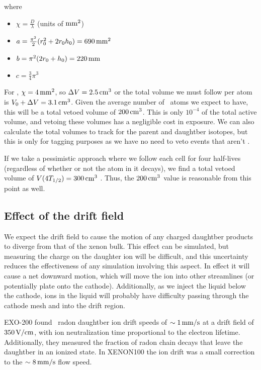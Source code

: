 where
\begin{itemize}
    \item $\chi = \frac{D}{\lambda}$ (units of $\mathrm{mm^2}$)
    \item $a = \frac{\pi^{2}}{2} (r_0^2+2 r_0 h_0) = 690\,\mathrm{mm^2}$
    \item $b = \pi^2 (2r_0 + h_0) = 220\,\mathrm{mm}$
    \item $c = \frac{3}{4} \pi^{3}$
\end{itemize}

For \Pb, $\chi = 4\,\mathrm{mm^2}$, so $\Delta V = 2.5\,\mathrm{cm^3}$ or the total volume we must follow per atom is $V_0 + \Delta V = 3.1\,\mathrm{cm^3}$. Given the average number of \Pb~atoms we expect to have, this will be a total vetoed volume of $200\,\mathrm{cm^3}$. This is only $10^{-4}$ of the total active volume, and vetoing these volumes has a negligible cost in exposure. We can also calculate the total volumes to track for the parent and daughtber isotopes, but this is only for tagging purposes as we have no need to veto events that aren't \Pb.

If we take a pessimistic approach where we follow each cell for four half-lives (regardless of whether or not the atom in it decays), we find a total vetoed volume of $V(4T_{1/2}) = 300\,\mathrm{cm^3}$ . Thus, the $200\,\mathrm{cm^3}$ value is reasonable from this point as well.

\subsection{Effect of the drift field}

We expect the drift field to cause the motion of any charged daughtber products to diverge from that of the xenon bulk. This effect can be simulated, but measuring the charge on the daughter ion will be difficult, and this uncertainty reduces the effectiveness of any simulation involving this aspect. In effect it will cause a net downward motion, which will move the ion into other streamlines (or potentially plate onto the cathode). Additionally, as we inject the liquid below the cathode, ions in the liquid will probably have difficulty passing through the cathode mesh and into the drift region.

EXO-200 found~\cite{Albert:2015vma} radon daughtber ion drift speeds of $\sim 1\,\mathrm{mm/s}$ at a drift field of $350\,\mathrm{V/cm}$, with ion neutralization time proportional to the electron lifetime. Additionally, they measured the fraction of radon chain decays that leave the daughtber in an ionized state. In XENON100 the ion drift was a small correction to the $\sim 8\,\mathrm{mm/s}$ flow speed.
